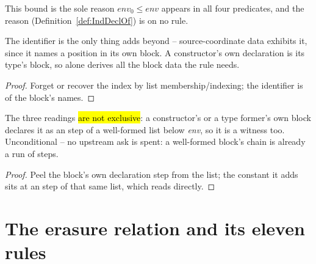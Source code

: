 \begin{remark}
This bound is the sole reason $\mathit{env}_0 \le \mathit{env}$ appears in all four predicates, and the reason  (Definition~\ref{def:IndDeclOf}) is on no rule.
\end{remark}

\begin{lemma}
\label{lem:IndInfo-arity}
\leanok
{}
 The \lbox{} identifier is the only thing  adds beyond  -- source-coordinate data exhibits it, since it names a position in its own block. A constructor's own declaration is its type's block, so  alone derives all the block data the  rule needs.
\end{lemma}
\begin{proof}
\leanok
{}
 Forget or recover the index by list membership/indexing; the identifier is  of the block's names.
\end{proof}

\begin{lemma}
\label{lem:CtorOf-constOrigin}
\leanok
{}
 The three readings \hl{are not exclusive}: a constructor's or a type former's own block declares it as an  step of a well-formed list below \emph{env}, so it is a  witness too.
 Unconditional -- no upstream ask is spent: a well-formed block's  chain is already a run of  steps.
\end{lemma}
\begin{proof}
\leanok
{}
 Peel the block's own declaration step from the list; the constant it adds sits at an  step of that same list, which  reads directly.
\end{proof}

\section{The erasure relation and its eleven rules}
\label{sec:erases:relation}

